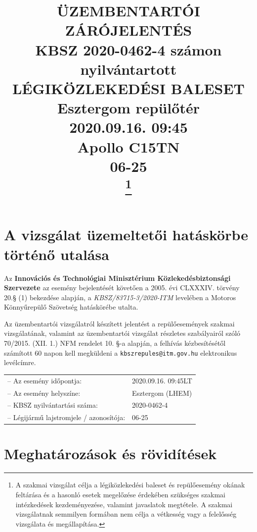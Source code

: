 \documentclass[a4paper,10pt]{article}
\title{%
    \textbf{ÜZEMBENTARTÓI ZÁRÓJELENTÉS} \\
    \vspace*{36pt}
    \textbf{KBSZ 2020-0462-4 számon nyilvántartott\\
    LÉGIKÖZLEKEDÉSI BALESET}\\
    \vspace*{24pt}
    Esztergom repülőtér\\
    \vspace*{24pt}
    2020.09.16. 09:45\\
    \vspace*{24pt}
    Apollo C15TN\\
    06-25\\
    \vspace*{6cm}
    \thanks{\normalsize{A szakmai vizsgálat célja a 
légiközlekedési baleset és repülőesemény 
okának feltárása és a hasonló esetek megelőzése érdekében szükséges szakmai 
intézkedések kezdeményezése, valamint javaslatok megtétele. A szakmai 
vizsgálatnak semmilyen formában nem célja a vétkesség vagy a felelősség 
vizsgálata és megállapítása.}}
}
\author{}
\date{}
\begin{document}
\maketitle
\pagebreak
\pagestyle{fancy}
\tableofcontents
\listoffigures
\pagebreak

%

\pagebreak


\section*{A vizsgálat üzemeltetői hatáskörbe történő utalása}
Az \textbf{Innovációs és Technológiai Minisztérium Közlekedésbiztonsági 
Szervezete} az esemény bejelentését követően a 2005. évi CLXXXIV. törvény 20.§ 
(1) bekezdése alapján, a \textit{KBSZ/83715-3/2020-ITM} levelében a 
Motoros Könnyűrepülő Szövetség hatáskörébe utalta.

Az üzembentartói vizsgálatról készített jelentést a repülőesemények szakmai 
vizsgálatának, valamint az üzembentartói vizsgálat részletes szabályairól szóló 
70/2015. (XII. 1.) NFM rendelet  10. §-a alapján, a felhívás kézbesítésétől 
számított 60 napon kell megküldeni a \texttt{kbszrepules@itm.gov.hu} 
elektronikus levélcímre.\\

\begin{tabular}{ll}
  -- Az esemény időpontja:& 2020.09.16. 09:45LT\\
  -- Az esemény helyszíne:& Esztergom (LHEM)\\
  -- KBSZ nyilvántartási száma:& 2020-0462-4\\
  -- Légijármű lajstromjele / azonosítója:& 06-25\\
\end{tabular}

\section*{Meghatározások és rövidítések}
\end{document}
